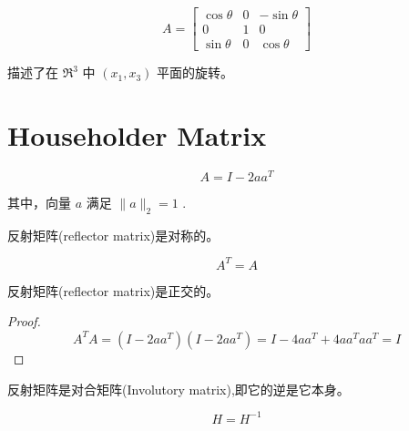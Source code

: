 \begin{example}
    \begin{equation} A=\left[\begin{array}{ccc}\cos \theta & 0 & -\sin \theta \\ 0 & 1 & 0 \\ \sin \theta & 0 & \cos \theta\end{array}\right] \end{equation}

    描述了在 $ \mathfrak{R}^{3} $ 中 $ \left(x_{1}, x_{3}\right) $ 平面的旋转。
\end{example}

\section{Householder Matrix}

\begin{definition}
    \begin{equation}
A=I-2 a a^{T}
\end{equation}

其中，向量 $ a $ 满足 $ \|a\|_{2}=1 $ .
\end{definition}

\begin{theorem}
    反射矩阵(reflector matrix)是对称的。

    \begin{equation}A^T=A\end{equation}
\end{theorem}

\begin{theorem}
    反射矩阵(reflector matrix)是正交的。

\end{theorem}

\begin{proof}
    \begin{equation} A^{T} A=\left(I-2 a a^{T}\right)\left(I-2 a a^{T}\right)=I-4 a a^{T}+4 a a^{T} a a^{T}=I \end{equation}
\end{proof}

\begin{theorem}
    反射矩阵是对合矩阵(Involutory matrix),即它的逆是它本身。

    \begin{equation}H =  H^{-1}\end{equation}
\end{theorem}

